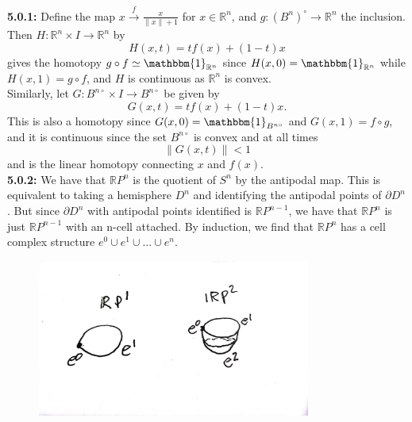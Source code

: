 \documentclass[a4paper]{article}
\begin{document}
\textbf{5.0.1:} Define the map $x \stackrel{f}{\to} \frac{x}{\|x\| + 1}$ for $x \in
    \mathbb{R}^{n}$, and $g  \colon (B^{n})^{\circ} \to \mathbb{R}^{n}$ the
    inclusion. Then
    $H  \colon \mathbb{R}^{n} \times I \to \mathbb{R}^{n}$ by
    \[
    H \left( x, t \right) = t f(x) + (1-t) x
    \] 
    gives the homotopy $g \circ f \simeq \mathbbm{1}_{\mathbb{R}^{n}}$ since
    $H(x,0) = \mathbbm{1}_{\mathbb{R}^{n}}$ while $H(x,1) = g \circ f$, and
    $H$ is continuous as $\mathbb{R}^{n}$ is convex.\\
    \linebreak
    Similarly, let
    $G  \colon B^{n \circ} \times I \to B^{n \circ} $ be given by
    \[
    G(x,t) = t f(x) + (1-t) x.
    \] 
    This is also a homotopy since
    $G(x,0) = \mathbbm{1}_{B^{n \circ}}$ and
    $G(x,1) = f \circ g$, and it is continuous since
    the set $B^{n \circ}$ is convex and at all times
    \[
    \|G(x,t)\| < 1
    \] 
    and is the linear homotopy connecting $x $ and $f(x)$.\\
    \linebreak
    \textbf{5.0.2:} We have that $\mathbb{R}P^{n}$ is the quotient of 
    $S^{n}$ by the antipodal map. This is equivalent to taking a hemisphere
    $D^{n}$ and identifying the antipodal points of  $\partial D^{n}$. But
    since
    $\partial D^{n}$ with antipodal points identified is 
    $\mathbb{R}P^{n-1}$, we have that $\mathbb{R}P^{n}$ is 
    just $\mathbb{R}P^{n-1}$ with an n-cell attached. By induction, we find
    that $\mathbb{R}P^{n}$ has a cell complex structure
    $e^{0} \cup e^{1} \cup \ldots \cup e^{n}$. 

    \begin{figure}[H]
        \centering
        \includegraphics[width=0.8\textwidth]{2.jpg}
        \label{fig:2-jpg}
    \end{figure}
    
    
    
    
\end{document}
